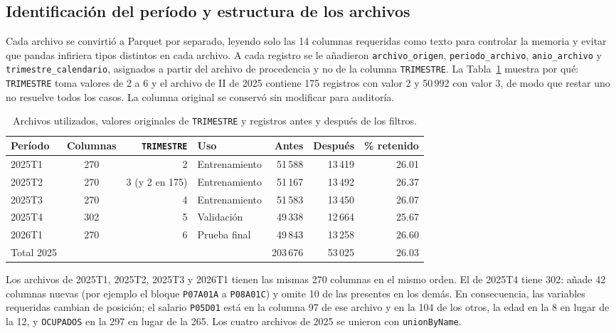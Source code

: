 \documentclass[11pt,a4paper]{article}
\newcommand{\var}[1]{\texttt{#1}}
\begin{document}
\subsection{Identificación del período y estructura de los archivos}

Cada archivo se convirtió a Parquet por separado, leyendo solo las 14 columnas requeridas como texto para controlar la memoria y evitar que pandas infiriera tipos distintos en cada archivo. A cada registro se le añadieron \var{archivo\_origen}, \var{periodo\_archivo}, \var{anio\_archivo} y \var{trimestre\_calendario}, asignados a partir del archivo de procedencia y no de la columna \var{TRIMESTRE}. La Tabla~\ref{tab:archivos} muestra por qué: \var{TRIMESTRE} toma valores de 2 a 6 y el archivo de II de 2025 contiene 175 registros con valor 2 y 50\,992 con valor 3, de modo que restar uno no resuelve todos los casos. La columna original se conservó sin modificar para auditoría.

\begin{table}[H]
\centering
\caption{Archivos utilizados, valores originales de \var{TRIMESTRE} y registros antes y después de los filtros.}
\label{tab:archivos}
\footnotesize\setlength{\tabcolsep}{4pt}
\begin{tabular}{lcrlrrr}
\toprule
Período & Columnas & \var{TRIMESTRE} & Uso & Antes & Después & \% retenido \\
\midrule
2025T1 & 270 & 2 & Entrenamiento & 51\,588 & 13\,419 & 26.01 \\
2025T2 & 270 & 3 (y 2 en 175) & Entrenamiento & 51\,167 & 13\,492 & 26.37 \\
2025T3 & 270 & 4 & Entrenamiento & 51\,583 & 13\,450 & 26.07 \\
2025T4 & 302 & 5 & Validación & 49\,338 & 12\,664 & 25.67 \\
2026T1 & 270 & 6 & Prueba final & 49\,843 & 13\,258 & 26.60 \\
\midrule
Total 2025 & & & & 203\,676 & 53\,025 & 26.03 \\
\bottomrule
\end{tabular}
\end{table}

Los archivos de 2025T1, 2025T2, 2025T3 y 2026T1 tienen las mismas 270 columnas en el mismo orden. El de 2025T4 tiene 302: añade 42 columnas nuevas (por ejemplo el bloque \var{P07A01A} a \var{P08A01C}) y omite 10 de las presentes en los demás. En consecuencia, las variables requeridas cambian de posición; el salario \var{P05D01} está en la columna 97 de ese archivo y en la 104 de los otros, la edad en la 8 en lugar de la 12, y \var{OCUPADOS} en la 297 en lugar de la 265. Los cuatro archivos de 2025 se unieron con \var{unionByName}.
\end{document}
